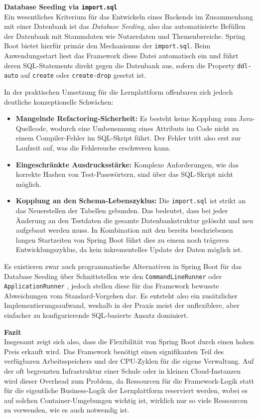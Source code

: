 \vspace{0.7cm}
\textbf{Database Seeding via \texttt{import.sql}} \cite{BaeldungMultipleImports} \\
Ein wesentliches Kriterium für das Entwickeln eines Backends im Zusammenhang mit einer Datenbank ist das \textit{Database Seeding}, also das automatisierte Befüllen der Datenbank mit Stammdaten wie Nutzerdaten und Themenbereiche. Spring Boot bietet hierfür primär den Mechanismus der \texttt{import.sql}. Beim Anwendungsstart liest das Framework diese Datei automatisch ein und führt deren SQL-Statements direkt gegen die Datenbank aus, sofern die Property \texttt{ddl-auto} auf \texttt{create} oder \texttt{create-drop} gesetzt ist. 

In der praktischen Umsetzung für die Lernplattform offenbaren sich jedoch deutliche konzeptionelle Schwächen:
\begin{itemize}
	\item \textbf{Mangelnde Refactoring-Sicherheit:} Es besteht keine Kopplung zum Java-Quellcode, wodurch eine Umbenennung eines Attributs im Code nicht zu einem Compiler-Fehler im SQL-Skript führt. Der Fehler tritt also erst zur Laufzeit auf, was die Fehlersuche erschweren kann.
	\item \textbf{Eingeschränkte Ausdrucksstärke:} Komplexe Anforderungen, wie das korrekte Hashen von Test-Passwörtern, sind über das SQL-Skript nicht möglich.
	\item \textbf{Kopplung an den Schema-Lebenszyklus:} Die \texttt{import.sql} ist strikt an das Neuerstellen der Tabellen gebunden. Das bedeutet, dass bei jeder Änderung an den Testdaten die gesamte Datenbankstruktur gelöscht und neu aufgebaut werden muss. In Kombination mit den bereits beschriebenen langen Startzeiten von Spring Boot führt dies zu einem noch trägeren Entwicklungszyklus, da kein inkrementelles Update der Daten möglich ist.
\end{itemize}

Es existieren zwar auch programmatische Alternativen in Spring Boot für das Database Seeding über Schnittstellen wie den \texttt{CommandLineRunner} oder \texttt{ApplicationRunner} \cite{MediumCommandLineRunnerApplicationRunner}, jedoch stellen diese für das Framework bewusste Abweichungen vom Standard-Vorgehen dar. Es entsteht also ein zusätzlicher Implementierungsaufwand, weshalb in der Praxis meist der unflexiblere, aber einfacher zu konfigurierende SQL-basierte Ansatz dominiert.


\vspace{0.7cm}
\textbf{Fazit} \\
Insgesamt zeigt sich also, dass die Flexibilität von Spring Boot durch einen hohen Preis erkauft wird. Das Framework benötigt einen signifikanten Teil des verfügbaren Arbeitsspeichers und der CPU-Zyklen für die eigene Verwaltung. Auf der oft begrenzten Infrastruktur einer Schule oder in kleinen Cloud-Instanzen wird dieser Overhead zum Problem, da Ressourcen für die Framework-Logik statt für die eigentliche Business-Logik der Lernplattform reserviert werden, wobei es auf solchen Container-Umgebungen wichtig ist, wirklich nur so viele Ressourcen zu verwenden, wie es auch notwendig ist.

